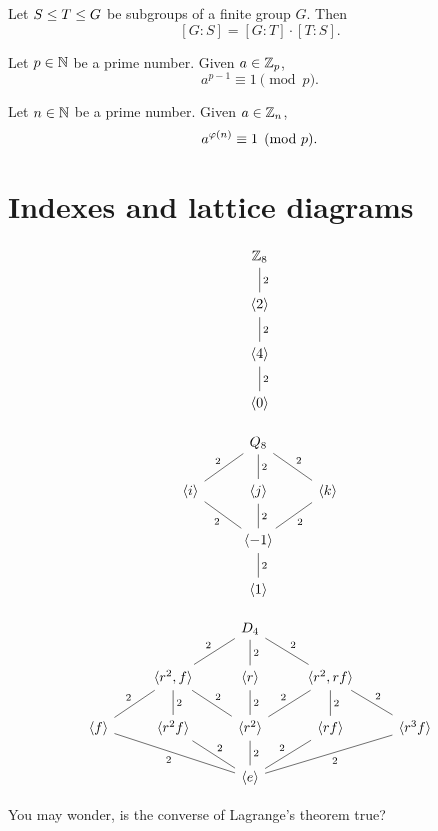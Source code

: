 \documentclass{ximera}
\begin{document}
\begin{corollary}
  Let $S \leq T \leq G$ be subgroups of a finite group
  $G$. Then
  \[
  [G:S] = [G:T]\cdot [T:S].
  \]
\end{corollary}


\begin{corollary}
  Let $p\in \mathbb N$ be a prime number. Given $a\in\mathbb Z_p$,
  \[
  a^{p-1}\equiv 1 \pmod{p}.
  \]
\end{corollary}


\begin{corollary}
  Let $n\in \mathbb N$ be a prime number. Given $a\in\mathbb Z_n$,
  \[
  a^{\eulerphi(n)}\equiv 1 \pmod{p}.
  \]
\end{corollary}



\section{Indexes and lattice diagrams}


\[
\begin{tikzcd}
  \Z_8  \ar[d,-,"2"] \\
  \<2\> \ar[d,-,"2"] \\
  \<4\> \ar[d,-,"2"] \\   
  \<0\> 
\end{tikzcd}
\]

\[
\begin{tikzcd}
       & Q_8 \ar[rd,-,"2"] \ar[d,-,"2"] \ar[ld,-,"2",swap] &       \\
\<i\>  \ar[rd,-,"2",swap] & \<j\>  \ar[d,-,"2"]     & \<k\> \ar[ld,-,"2"]\\
&\< -1\> \ar[d,-,"2"]&        \\   
       & \<1\> &
\end{tikzcd}
\]


\[
\begin{tikzcd}
   &    & D_4 \ar[rd,-,"2"] \ar[d,-,"2"] \ar[ld,-,"2",swap] &       \\
&\<r^2,f\>  \ar[rd,-,"2"] \ar[d,-,"2"] \ar[ld,-,"2",swap]& \<r \>  \ar[d,-,"2"]     & \<r^2,rf\> \ar[ld,-,"2",swap] \ar[d,-,"2"] \ar[rd,-,"2"]\\
\<f\>\ar[rrd,-,"2",swap]& \<r^2f\> \ar[rd,-,"2"]&\< r^2\> \ar[d,-,"2"]  &   \<rf\> \ar[ld,-,"2",swap]& \<r^3f\>\ar[lld,-,"2"]     \\   
  &     & \<e\> &  &
\end{tikzcd}
\]













You may wonder, is the converse of Lagrange's theorem true?
\end{document}
